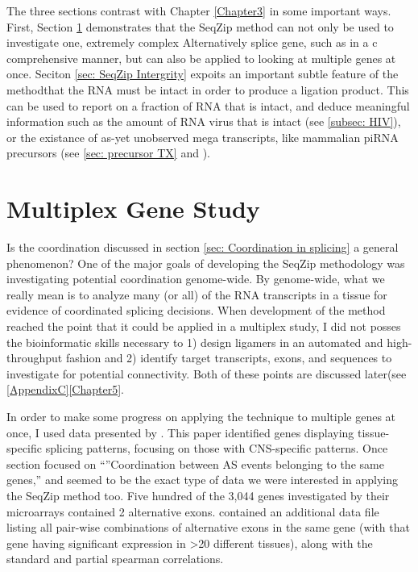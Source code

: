   The three sections contrast with Chapter \ref{Chapter3} in some important ways. First, Section \ref{sec: Multiplex Gene Study} demonstrates that the SeqZip method can not only be used to investigate one, extremely complex Alternatively splice gene, such as \dscam{} in a c comprehensive manner, but can also be applied to looking at multiple genes at once. Seciton \ref{sec: SeqZip Intergrity} expoits an important subtle feature of the method\textemdash that the RNA must be intact in order to produce a ligation product. This can be used to report on a fraction of RNA that is intact, and deduce meaningful information such as the amount of RNA virus that is intact (see \ref{subsec: HIV}), or the existance of as-yet unobserved mega transcripts, like mammalian piRNA precursors (see \ref{sec: precursor TX} and \citep{Li2013h,Li2013}).

\section{Multiplex Gene Study}\label{sec: Multiplex Gene Study}

  Is the coordination discussed in section \ref{sec: Coordination in splicing} a general phenomenon? One of the major goals of developing the SeqZip methodology was investigating potential coordination genome-wide. By genome-wide, what we really mean is to analyze many (or all) of the RNA transcripts in a tissue for evidence of coordinated splicing decisions. When development of the method reached the point that it could be applied in a multiplex study, I did not posses the bioinformatic skills necessary to 1) design ligamers in an automated and high-throughput fashion and 2) identify target transcripts, exons, and sequences to investigate for potential connectivity. Both of these points are discussed later(see \ref{AppendixC}\ref{Chapter5}. 

  In order to make some progress on applying the technique to multiple genes at once, I used data presented by \citet{Fagnani2007}. This paper identified genes displaying tissue-specific splicing patterns, focusing on those with CNS-specific patterns. Once section focused on ``''Coordination between AS events belonging to the same genes,'' and seemed to be the exact type of data we were interested in applying the SeqZip method too. Five hundred of the 3,044 genes investigated by their microarrays contained 2 alternative exons. \citet{Fagnani2007} contained an additional data file listing all pair-wise combinations of alternative exons in the same gene (with that gene having significant expression in >20 different tissues), along with the standard and partial spearman correlations. 

